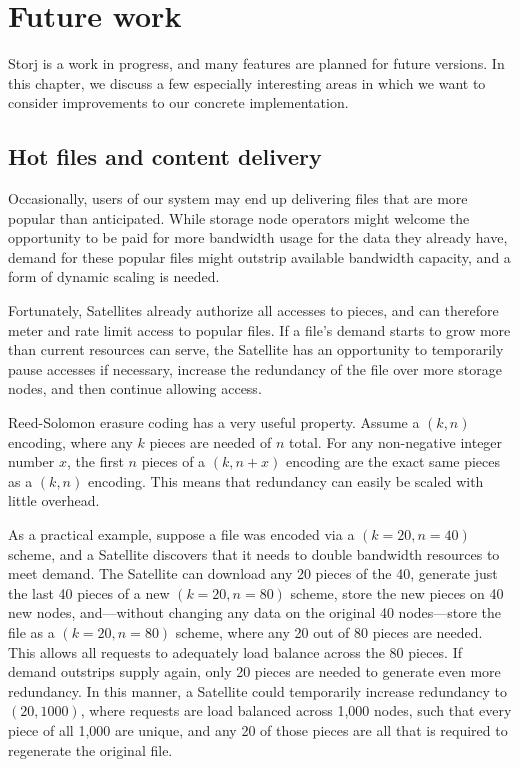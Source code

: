 \documentclass[8pt,fleqn,openany]{book}
\begin{document}
\chapter{Future work}\label{chap:future-work}

Storj is a work in progress, and many features are planned for future
versions. In this chapter, we discuss a few especially interesting areas in
which we want to consider improvements to our concrete implementation.

\section{Hot files and content delivery}\label{sec:future-hot-files}

Occasionally, users of our system may end up delivering files that are more
popular than anticipated. While storage node operators might welcome the
opportunity to be paid for more bandwidth usage for the data they already have,
demand for these popular files might outstrip available bandwidth capacity,
and a form of dynamic scaling is needed.

Fortunately, Satellites already authorize all accesses to pieces, and
can therefore meter and rate limit access to popular
files. If a file's demand starts to grow more than current resources can serve,
the Satellite has an opportunity to temporarily pause accesses if necessary,
increase the redundancy of the file over more storage nodes, and then continue
allowing access.

Reed-Solomon erasure coding has a very useful property. Assume a $(k, n)$
encoding, where any $k$ pieces are needed of $n$ total. For any non-negative
integer number $x$, the first $n$ pieces of a $(k, n+x)$ encoding are the exact
same pieces as a $(k, n)$ encoding. This means that redundancy can easily be
scaled with little overhead.

As a practical example, suppose a file was encoded via a $(k=20, n=40)$ scheme,
and a Satellite discovers that it needs to double bandwidth resources to meet demand.
The Satellite can download any 20 pieces of the 40, generate just the last 40
pieces of a new $(k=20, n=80)$ scheme, store the new pieces on 40 new nodes,
and---without changing any data on the original 40 nodes---store the file
as a $(k=20, n=80)$ scheme, where any 20 out of 80 pieces are needed.
This allows all requests to adequately load balance across the 80 pieces.
If demand outstrips supply again, only 20 pieces are needed to generate even
more redundancy. In this manner, a Satellite could temporarily increase
redundancy to $(20, 1000)$, where requests are load balanced across 1,000 nodes,
such that every piece of all 1,000 are unique, and any 20 of those pieces are
all that is required to regenerate the original file.
\end{document}
